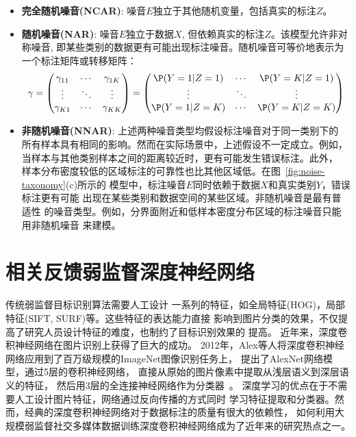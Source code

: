 \begin{itemize}
    \item \textbf{完全随机噪音(NCAR)}:
        噪音$E$独立于其他随机变量，包括真实的标注$Z$。
    \item \textbf{随机噪音(NAR)}:
        噪音$E$独立于数据$X$, 但依赖真实的标注$Z$。该模型允许非对称噪音,
        即某些类别的数据更有可能出现标注噪音。随机噪音可等价地表示为一个标注矩阵或转移矩阵：
        \begin{eqnarray}
            \gamma =
            \begin{pmatrix}
                \gamma_{11} & \cdots & \gamma_{1K} \\ 
                \vdots & \ddots & \vdots \\ 
                \gamma_{K1} & \cdots & \gamma_{KK}
            \end{pmatrix}
            =
            \begin{pmatrix}
                \P(Y = 1|Z=1) & \cdots & \P(Y= K|Z=1) \\ 
                \vdots & \ddots & \vdots \\ 
                \P(Y = 1|Z=K) & \cdots & \P(Y = K|Z=K)
            \end{pmatrix}
        \end{eqnarray}
    \item \textbf{非随机噪音(NNAR)}: 上述两种噪音类型均假设标注噪音对于同一类别下的
        所有样本具有相同的影响。然而在实际场景中，上述假设不一定成立。例如，
        当样本与其他类别样本之间的距离较近时，更有可能发生错误标注。此外，
        样本分布密度较低的区域标注的可靠性也比其他区域低。在图~\ref{fig:noise-taxonomy}(c)所示的
        模型中，标注噪音$E$同时依赖于数据$X$和真实类别$Y$，错误标注更有可能
        出现在某些类别和数据空间的某些区域。非随机噪音是最有普适性
        的噪音类型。例如，分界面附近和低样本密度分布区域的标注噪音只能用非随机噪音
        来建模。
\end{itemize}

\section{相关反馈弱监督深度神经网络}
传统弱监督目标识别算法需要人工设计
一系列的特征，如全局特征(HOG)，局部特征(SIFT, SURF)等。这些特征的表达能力直接
影响到图片分类的效果，不仅提高了研究人员设计特征的难度，也制约了目标识别效果的
提高。
近年来，深度卷积神经网络在图片识别上获得了巨大的成功。
2012年，Alex等人将深度卷积神经网络应用到了百万级规模的ImageNet图像识别任务上，
提出了AlexNet网络模型，通过5层的卷积神经网络，
直接从原始的图片像素中提取从浅层语义到深层语义的特征，
然后用3层的全连接神经网络作为分类器~\cite{krizhevsky2012imagenet}。
深度学习的优点在于不需要人工设计图片特征，网络通过反向传播的方式同时
学习特征提取和分类器。然而，经典的深度卷积神经网络对于数据标注的质量有很大的依赖性，
如何利用大规模弱监督社交多媒体数据训练深度卷积神经网络成为了近年来的研究热点之一。


